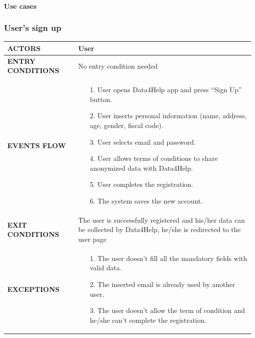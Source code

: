 \documentclass[a4paper]{article}
\begin{document}
    
    \paragraph{Use cases}

\subsubsection{User's sign up}
\begin{center}
    \begin{tabular}{ l || p{8cm} ||}
        \bf{ACTORS} & User \\ 
        \hline
        \bf{ENTRY CONDITIONS} & No entry condition needed  \\ 
        \hline
        \bf{EVENTS FLOW} & \begin{itemize}[noitemsep, topsep=0cm, leftmargin=*] \vspace{-0.2cm}
            \item[1.] User opens Data4Help app and press “Sign Up” button.
            \item[2.] User inserts personal information (name, address, age, gender, fiscal code).
            \item[3.] User selects email and password.
            \item[4.] User allows terms of conditions to share anonymized data with Data4Help.
            \item[5.] User completes the registration.
            \item[6.] The system saves the new account.
        \end{itemize}\\ 
        \hline
        \bf{EXIT CONDITIONS} & The user is successfully registered and his/her data can be collected by Data4Help, he/she is redirected to the user page\\ \hline
        \bf{EXCEPTIONS} & \begin{itemize}[noitemsep, topsep=0cm, leftmargin=*] \vspace{-0.2cm}
            \item[1.] The user doesn’t fill all the mandatory fields with valid data.
            \item[2.]The inserted email is already used by another user.
            \item[3.] The user doesn’t allow the term of condition and he/she can’t complete the registration.
        \end{itemize}
        \\ \hline \hline
    \end{tabular}
\end{center}
\end{document}
